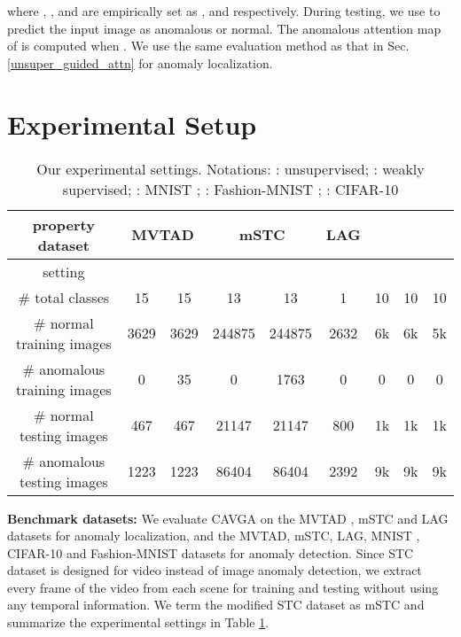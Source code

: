 \documentclass[runningheads]{llncs}
\begin{document}
where , , and  are empirically set as , and  respectively. During testing, we use  to predict the input image  as anomalous or normal. The anomalous attention map  of  is computed when . We use the same evaluation method as that in Sec. \ref{unsuper_guided_attn} for anomaly localization.



\section{Experimental Setup}
\label{experiments}
\begin{table}[t]
\begin{center}
\renewcommand{\arraystretch}{0.9}
\setlength{\tabcolsep}{3.0pt}
\scriptsize
\caption{
Our experimental settings. Notations: : unsupervised; : weakly supervised; : MNIST \cite{lecun1998gradient}; : Fashion-MNIST \cite{xiao2017fashion}; : CIFAR-10 \cite{krizhevsky2009learning}
}
\label{summary_datasets}
\begin{tabular}{ccccccccc}
\toprule
		  property  dataset             &\multicolumn{2}{c}{MVTAD \cite{bergmann2019mvtec}}   &\multicolumn{2}{c}{mSTC \cite{liu2018future}} 
		  &LAG \cite{Li_2019_CVPR} & & &\\   
\midrule
		   setting            & & & & & & & &\\
		   \# total classes &15 &15 &13 &13 &1 &10 &10 &10\\
		   \# normal training images        &3629                &3629          &244875        &244875 &2632 &6k &6k &5k\\
		   \# anomalous training images        &0                &35          &0        &1763 &0 &0  &0 &0\\
		   \# normal testing images        &467 &467 &21147 &21147 &800 & 1k &1k &1k\\
		   \# anomalous testing images        &1223 &1223 &86404 &86404 & 2392 &9k &9k &9k\\
\bottomrule
\end{tabular}
\end{center}

\end{table}


\textbf{Benchmark datasets:} We evaluate CAVGA on the MVTAD \cite{bergmann2019mvtec}, mSTC \cite{liu2018future} and  LAG \cite{Li_2019_CVPR} datasets for anomaly localization, and the MVTAD, mSTC, LAG, MNIST \cite{lecun1998gradient}, CIFAR-10 \cite{krizhevsky2009learning} and Fashion-MNIST \cite{xiao2017fashion} datasets for anomaly detection. Since  STC dataset \cite{liu2018future} is designed for video instead of image anomaly detection, we extract every  frame of the video from each scene for training and testing without using any temporal information. We term the modified STC dataset as mSTC and summarize the experimental settings in Table \ref{summary_datasets}.
\end{document}
